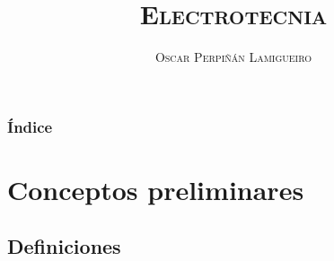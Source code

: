 \documentclass[serif, xcolor=dvipsnames]{beamer}
\begin{document}
\title{\textsc{Electrotecnia}}


\author{\textsc{Oscar Perpiñán Lamigueiro}}
\date{}

\frame[plain]{\titlepage}


\setcounter{tocdepth}{1}%

%


\begin{frame}[plain]
\frametitle{Índice}

\tableofcontents{}


\end{frame}
\section{Conceptos preliminares}

\subsection{Definiciones}
\end{document}
